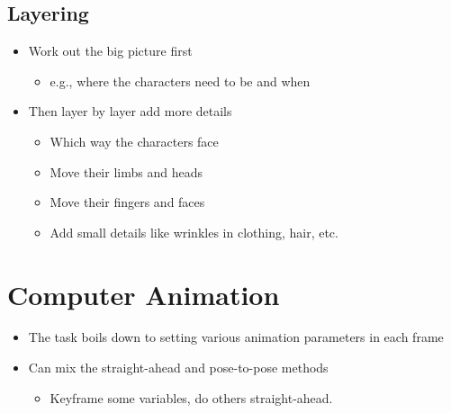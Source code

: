 \documentclass{article}
\begin{document}
\subsection*{Layering}
\begin{itemize}
    \item Work out the big picture first 
    \begin{itemize}
        \item e.g., where the characters need to be and when
    \end{itemize}
    \item Then layer by layer add more details
    \begin{itemize}
        \item Which way the characters face
        \item Move their limbs and heads
        \item Move their fingers and faces
        \item Add small details like wrinkles in clothing, hair, etc.
    \end{itemize}
\end{itemize}
    

\section*{Computer Animation}
\begin{itemize}
    \item The task boils down to setting various animation parameters in each frame
    \item Can mix the straight-ahead and pose-to-pose methods
    \begin{itemize}
        \item Keyframe some variables, do others straight-ahead.
    \end{itemize}
\end{itemize}
\end{document}
